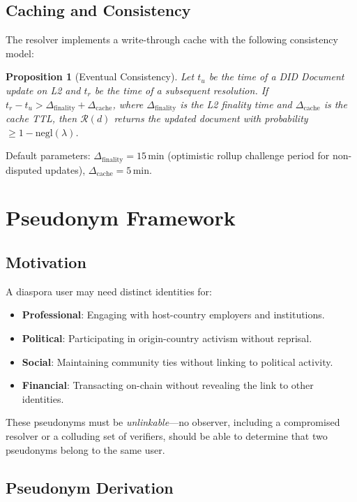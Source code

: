 \documentclass[11pt,a4paper]{article}
\newtheorem{proposition}[theorem]{Proposition}
\begin{document}
\subsection{Caching and Consistency}

The resolver implements a write-through cache with the following consistency model:

\begin{proposition}[Eventual Consistency]
Let $t_u$ be the time of a DID Document update on L2 and $t_r$ be the time of a
subsequent resolution. If $t_r - t_u > \Delta_{\text{finality}} + \Delta_{\text{cache}}$,
where $\Delta_{\text{finality}}$ is the L2 finality time and $\Delta_{\text{cache}}$
is the cache TTL, then $\mathcal{R}(d)$ returns the updated document with
probability $\geq 1 - \text{negl}(\lambda)$.
\end{proposition}

Default parameters: $\Delta_{\text{finality}} = 15\,\text{min}$ (optimistic rollup
challenge period for non-disputed updates), $\Delta_{\text{cache}} = 5\,\text{min}$.

\section{Pseudonym Framework}
\label{sec:pseudonyms}

\subsection{Motivation}

A diaspora user may need distinct identities for:
\begin{itemize}
    \item \textbf{Professional}: Engaging with host-country employers and institutions.
    \item \textbf{Political}: Participating in origin-country activism without reprisal.
    \item \textbf{Social}: Maintaining community ties without linking to political activity.
    \item \textbf{Financial}: Transacting on-chain without revealing the link to other identities.
\end{itemize}

These pseudonyms must be \emph{unlinkable}---no observer, including a compromised
resolver or a colluding set of verifiers, should be able to determine that two
pseudonyms belong to the same user.

\subsection{Pseudonym Derivation}
\end{document}
